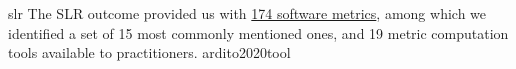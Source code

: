 \documentclass{article}
\begin{document}
\lnQuote
  {slr}
  {The SLR outcome provided us with \ul{174 software metrics}, among which we identified a set of 15 most commonly mentioned ones, and 19 metric computation tools available to practitioners.}
  {ardito2020tool}



\end{document}
